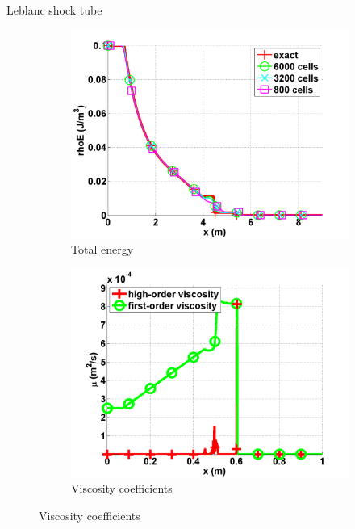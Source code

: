 \documentclass[xcolor=dvipsnames,10pt]{beamer}
\begin{document}
\begin{frame}{Leblanc shock tube}
\begin{figure}[H]
        \begin{subfigure}[b]{0.37\textwidth}
                \centering
                \includegraphics[width=\textwidth]{../figures/Leblanc_exact_and_numerical_stt_total_energy_6000.png}
                \caption{Total energy}
        \end{subfigure}
        \begin{subfigure}[b]{0.37\textwidth}
                \centering
                \includegraphics[width=\textwidth]{../figures/Leblanc_viscosity_numerical_6000.png}
                \caption{Viscosity coefficients}
        \end{subfigure}
\end{figure}
\end{frame}
\end{document}
